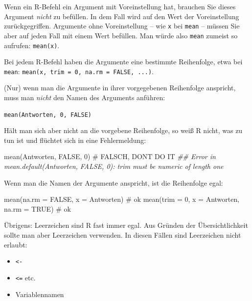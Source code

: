 \documentclass[
  letterpaper,
  twoside,
  open=any]{scrbook}
\newenvironment{Shaded}{\begin{snugshade}}{\end{snugshade}}
\newcommand{\AttributeTok}[1]{\textcolor[rgb]{0.40,0.45,0.13}{#1}}
\newcommand{\CommentTok}[1]{\textcolor[rgb]{0.37,0.37,0.37}{#1}}
\newcommand{\ConstantTok}[1]{\textcolor[rgb]{0.56,0.35,0.01}{#1}}
\newcommand{\DecValTok}[1]{\textcolor[rgb]{0.68,0.00,0.00}{#1}}
\newcommand{\DocumentationTok}[1]{\textcolor[rgb]{0.37,0.37,0.37}{\textit{#1}}}
\newcommand{\FunctionTok}[1]{\textcolor[rgb]{0.28,0.35,0.67}{#1}}
\newcommand{\NormalTok}[1]{\textcolor[rgb]{0.00,0.23,0.31}{#1}}
\providecommand{\tightlist}{%
  \setlength{\itemsep}{0pt}\setlength{\parskip}{0pt}}\usepackage{longtable,booktabs,array}
\theoremstyle{definition}
\theoremstyle{definition}
\theoremstyle{definition}
\theoremstyle{remark}
\begin{document}
Wenn ein R-Befehl ein Argument mit Voreinstellung hat, brauchen Sie
dieses Argument \emph{nicht} zu befüllen. In dem Fall wird auf den Wert
der Voreinstellung zurückgegriffen. Argumente ohne Voreinstellung -- wie
\texttt{x} bei \texttt{mean} -- müssen Sie aber auf jeden Fall mit einem
Wert befüllen. Man würde also \texttt{mean} zumeist so aufrufen:
\texttt{mean(x)}.

Bei jedem R-Befehl haben die Argumente eine bestimmte Reihenfolge, etwa
bei \texttt{mean}:
\texttt{mean(x,\ trim\ =\ 0,\ na.rm\ =\ FALSE,\ ...)}.

(Nur) wenn man die Argumente in ihrer vorgegebenen Reihenfolge
anspricht, muss man \emph{nicht} den Namen des Arguments anführen:

 \texttt{mean(Antworten,\ 0,\ FALSE)}

Hält man sich aber nicht an die vorgebene Reihenfolge, so weiß R nicht,
was zu tun ist und flüchtet sich in eine Fehlermeldung:

\begin{Shaded}
\begin{Highlighting}[]
\FunctionTok{mean}\NormalTok{(Antworten, }\ConstantTok{FALSE}\NormalTok{, }\DecValTok{0}\NormalTok{)  }\CommentTok{\# FALSCH, DON\textquotesingle{}T DO IT }
\DocumentationTok{\#\# Error in mean.default(Antworten, FALSE, 0): \textquotesingle{}trim\textquotesingle{} must be numeric of length one}
\end{Highlighting}
\end{Shaded}

Wenn man die Namen der Argumente anspricht, ist die Reihenfolge egal:

\begin{Shaded}
\begin{Highlighting}[]
\FunctionTok{mean}\NormalTok{(}\AttributeTok{na.rm =} \ConstantTok{FALSE}\NormalTok{, }\AttributeTok{x =}\NormalTok{ Antworten)  }\CommentTok{\# ok}
\FunctionTok{mean}\NormalTok{(}\AttributeTok{trim =} \DecValTok{0}\NormalTok{, }\AttributeTok{x =}\NormalTok{ Antworten, }\AttributeTok{na.rm =} \ConstantTok{TRUE}\NormalTok{)  }\CommentTok{\# ok}
\end{Highlighting}
\end{Shaded}

Übrigens: Leerzeichen sind R fast immer egal. Aus Gründen der
Übersichtlichkeit sollte man aber Leerzeichen verwenden. In diesen
Fällen sind Leerzeichen nicht erlaubt:

\begin{itemize}
\tightlist
\item
  \texttt{\textless{}-}
\item
  \texttt{\textless{}=} etc.
\item
  Variablennamen
\end{itemize}
\end{document}
